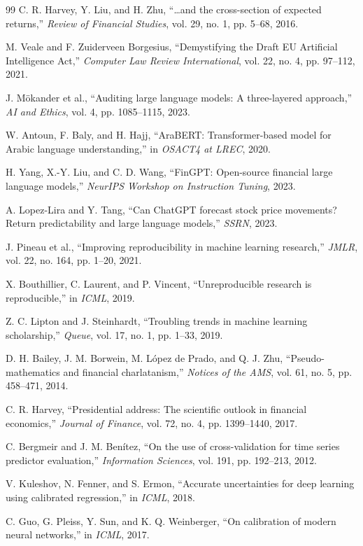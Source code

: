 \documentclass[conference]{IEEEtran}
\begin{document}
\begin{thebibliography}{99}
C. R. Harvey, Y. Liu, and H. Zhu, ``\ldots and the cross-section of expected returns,'' \textit{Review of Financial Studies}, vol. 29, no. 1, pp. 5--68, 2016.

M. Veale and F. Zuiderveen Borgesius, ``Demystifying the Draft EU Artificial Intelligence Act,'' \textit{Computer Law Review International}, vol. 22, no. 4, pp. 97--112, 2021.

J. Mökander et al., ``Auditing large language models: A three-layered approach,'' \textit{AI and Ethics}, vol. 4, pp. 1085--1115, 2023.

W. Antoun, F. Baly, and H. Hajj, ``AraBERT: Transformer-based model for Arabic language understanding,'' in \textit{OSACT4 at LREC}, 2020.

H. Yang, X.-Y. Liu, and C. D. Wang, ``FinGPT: Open-source financial large language models,'' \textit{NeurIPS Workshop on Instruction Tuning}, 2023.

A. Lopez-Lira and Y. Tang, ``Can ChatGPT forecast stock price movements? Return predictability and large language models,'' \textit{SSRN}, 2023.

J. Pineau et al., ``Improving reproducibility in machine learning research,'' \textit{JMLR}, vol. 22, no. 164, pp. 1--20, 2021.

X. Bouthillier, C. Laurent, and P. Vincent, ``Unreproducible research is reproducible,'' in \textit{ICML}, 2019.

Z. C. Lipton and J. Steinhardt, ``Troubling trends in machine learning scholarship,'' \textit{Queue}, vol. 17, no. 1, pp. 1--33, 2019.

D. H. Bailey, J. M. Borwein, M. López de Prado, and Q. J. Zhu, ``Pseudo-mathematics and financial charlatanism,'' \textit{Notices of the AMS}, vol. 61, no. 5, pp. 458--471, 2014.

C. R. Harvey, ``Presidential address: The scientific outlook in financial economics,'' \textit{Journal of Finance}, vol. 72, no. 4, pp. 1399--1440, 2017.

C. Bergmeir and J. M. Benítez, ``On the use of cross-validation for time series predictor evaluation,'' \textit{Information Sciences}, vol. 191, pp. 192--213, 2012.

V. Kuleshov, N. Fenner, and S. Ermon, ``Accurate uncertainties for deep learning using calibrated regression,'' in \textit{ICML}, 2018.

C. Guo, G. Pleiss, Y. Sun, and K. Q. Weinberger, ``On calibration of modern neural networks,'' in \textit{ICML}, 2017.

\end{thebibliography}

\balance
\end{document}
